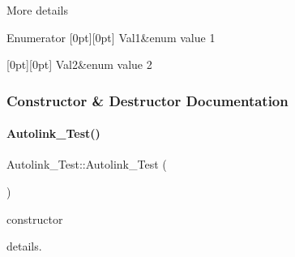 More details \begin{DoxyEnumFields}{Enumerator}
[0pt][0pt]{}\hypertarget{class_autolink___test_aeb611627c332d067bded1806b1bb45c2af70631e295bce280e74762d18af47a94}{}\label{class_autolink___test_aeb611627c332d067bded1806b1bb45c2af70631e295bce280e74762d18af47a94} 
Val1&enum value 1 \\
\hline

[0pt][0pt]{}\hypertarget{class_autolink___test_aeb611627c332d067bded1806b1bb45c2a7d760f44a8971559d108a609b8fb9b3b}{}\label{class_autolink___test_aeb611627c332d067bded1806b1bb45c2a7d760f44a8971559d108a609b8fb9b3b} 
Val2&enum value 2 \\
\hline

\end{DoxyEnumFields}


\subsubsection{Constructor \& Destructor Documentation}
\hypertarget{class_autolink___test_a278d631f9943428c05b17d78f14488e2}{}\label{class_autolink___test_a278d631f9943428c05b17d78f14488e2} 
\paragraph{\texorpdfstring{Autolink\+\_\+\+Test()}{Autolink\_Test()}}
{\footnotesize\ttfamily Autolink\+\_\+\+Test\+::\+Autolink\+\_\+\+Test (\begin{DoxyParamCaption}{ }\end{DoxyParamCaption})}



constructor 

details. \hypertarget{class_autolink___test_a03bf46c8e2b733680035f524fd7b193b}{}\label{class_autolink___test_a03bf46c8e2b733680035f524fd7b193b} 
